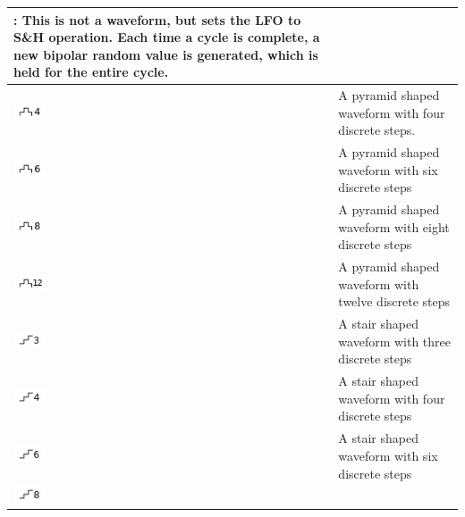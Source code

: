 {\begin{tabular}{| L{0.12\textwidth} | L{0.8\textwidth} |}
        : This is not a waveform, but sets the LFO to S\&H operation. Each time a cycle is complete, a new bipolar random value is generated, which is held for the entire cycle.\\
        \hline
        \includegraphics[width=0.1\textwidth]{graphics/LFO/pyram4.png}    &
        A pyramid shaped waveform with four discrete steps.\\
        \hline
        \includegraphics[width=0.1\textwidth]{graphics/LFO/pyram6.png}    &
        A pyramid shaped waveform with six discrete steps\\
        \hline
        \includegraphics[width=0.1\textwidth]{graphics/LFO/pyram8.png}    &
        A pyramid shaped waveform with eight discrete steps\\
        \hline
        \includegraphics[width=0.1\textwidth]{graphics/LFO/pyram12.png}   &
        A pyramid shaped waveform with twelve discrete steps\\
        \hline
        \includegraphics[width=0.1\textwidth]{graphics/LFO/stair3.png}    &
        A stair shaped waveform with three discrete steps\\
        \hline
        \includegraphics[width=0.1\textwidth]{graphics/LFO/stair4.png}    &
        A stair shaped waveform with four discrete steps\\
        \hline
        \includegraphics[width=0.1\textwidth]{graphics/LFO/stair6.png}    &
        A stair shaped waveform with six discrete steps\\
        \hline
        \includegraphics[width=0.1\textwidth]{graphics/LFO/stair8.png}    &

\end{tabular}}
